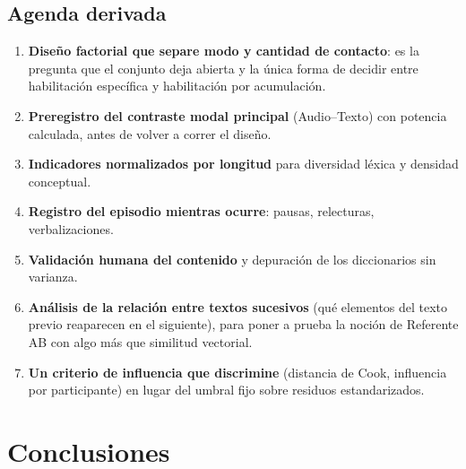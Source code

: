 \documentclass[12pt]{article}
\begin{document}
\subsection{Agenda derivada}

\begin{enumerate}
	\item \textbf{Diseño factorial que separe modo y cantidad de contacto}: es la pregunta que el
	conjunto deja abierta y la única forma de decidir entre habilitación específica y habilitación
	por acumulación.
	\item \textbf{Preregistro del contraste modal principal} (Audio--Texto) con potencia
	calculada, antes de volver a correr el diseño.
	\item \textbf{Indicadores normalizados por longitud} para diversidad léxica y densidad
	conceptual.
	\item \textbf{Registro del episodio mientras ocurre}: pausas, relecturas, verbalizaciones.
	\item \textbf{Validación humana del contenido} y depuración de los diccionarios sin varianza.
	\item \textbf{Análisis de la relación entre textos sucesivos} (qué elementos del texto previo
	reaparecen en el siguiente), para poner a prueba la noción de Referente AB con algo más que
	similitud vectorial.
	\item \textbf{Un criterio de influencia que discrimine} (distancia de Cook, influencia por
	participante) en lugar del umbral fijo sobre residuos estandarizados.
\end{enumerate}

\section{Conclusiones}
\end{document}
